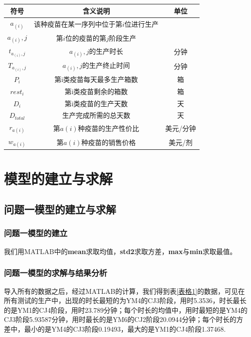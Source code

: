 \documentclass{ctexart}
\begin{document}
\begin{table}[H]
	\centering 
	\begin{tabular}{ccc}
		\toprule
		符号 & 含义说明 & 单位 \\
		\midrule
		$a_{(i)}$ & 该种疫苗在某一序列中位于第$i$位进行生产 & \\
		$a_{(i)},j$ & 第$i$位的疫苗的第$j$阶段生产 & \\
		$t_{a_{(i)},j}$ & $a_{(i)},j$的生产时长 & 分钟 \\
		$T_{a_{(i)},j}$ & $a_{(i)},j$的生产终止时间 & 分钟 \\
		$P_i$ & 第i类疫苗每天最多生产箱数 & 箱 \\
		$rest_i$ & 第i类疫苗剩余的箱数 & 箱 \\
		$D_i$ & 第i类疫苗的生产天数 & 天 \\
		$D_{total}$ & 生产完成所需的总天数 & 天 \\
		$r_{a(i)}$ & 第$a(i)$种疫苗的生产性价比 & 美元/分钟 \\
		$w_{a(i)}$ & 第$a(i)$种疫苗的销售价格 & 美元/剂 \\
		\bottomrule
	\end{tabular}
\end{table}



\section{模型的建立与求解}
\subsection{问题一模型的建立与求解}
\subsubsection{问题一模型的建立}
我们用MATLAB中的\textbf{mean}求取均值，\textbf{std2}求取方差，\textbf{max}与\textbf{min}求取最值。
\subsubsection{问题一模型的求解与结果分析}
导入所有的数据之后，经过MATLAB的计算，我们得到表\ref{表格1}的数据，可见在所有测试的生产中，出现的时长最短的为YM4的CJ3阶段，用时5.3536，时长最长的是YM1的CJ4阶段，用时23.789分钟；每个时长的均值中，用时最短的是YM4的CJ3阶段5.93587分钟，用时最长的是YM6的CJ2阶段20.0944分钟；每个时长的方差中，最小的是YM4的CJ3阶段0.19493，最大的是YM1的CJ4阶段1.37468.
\end{document}
